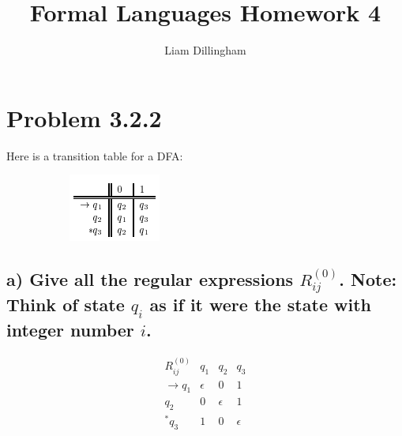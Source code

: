 \documentclass[20pt]{article} %
\title{Formal Languages Homework 4}
\author{Liam Dillingham}
\begin{document}
\maketitle

\section{Problem 3.2.2}
Here is a transition table for a DFA:
\begin{figure}[!htbp]
  	\centering
   	\begin{subfigure}[p]{0.25\linewidth}
    	\includegraphics[width=\linewidth]{./figures/HW4fig1.png}
   	\end{subfigure}
\end{figure} 


\subsection{a) Give all the regular expressions $R_{ij}^{(0)}$. Note: Think of state $q_i$ as if it were the state with integer number $i$.}

\begin{table}[!htbp]
\[\begin{array}{c|ccc}
R_{ij}^{(0)} & q_1 & q_2 & q_3 \\
\hline
\rightarrow q_1 & \epsilon & 0 & 1 \\
q_2 & 0 & \epsilon & 1 \\
^{*}q_3 & 1 & 0 & \epsilon \\
\end{array}\]
\end{table}
\end{document}
